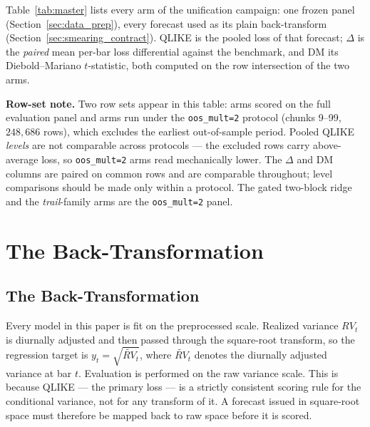 Table~\ref{tab:master} lists every arm of the unification campaign: one
frozen panel (Section~\ref{sec:data_prep}), every forecast used as its
plain back-transform (Section~\ref{sec:smearing_contract}). QLIKE is the
pooled loss of that forecast;
$\Delta$ is the \emph{paired} mean per-bar loss differential against the
benchmark, and DM its Diebold--Mariano $t$-statistic, both computed on the
row intersection of the two arms.

\textbf{Row-set note.} Two row sets
appear in this table: arms scored on the full evaluation panel and
arms run under the \texttt{oos\_mult=2} protocol (chunks 9--99,
$248{,}686$ rows), which excludes the earliest out-of-sample period.
Pooled QLIKE \emph{levels} are not comparable across protocols --- the
excluded rows carry above-average loss, so \texttt{oos\_mult=2} arms
read mechanically lower. The $\Delta$ and DM columns are paired on
common rows and are comparable throughout; level comparisons should be
made only within a protocol. The gated two-block ridge and the
\emph{trail}-family arms are the \texttt{oos\_mult=2} panel.
\iffalse
\section{The Back-Transformation}
\label{sec:appendix_backtransform}

\subsection{The Back-Transformation}
\label{sec:smearing_bias}

Every model in this paper is fit on the preprocessed scale. Realized variance
$RV_t$ is diurnally adjusted and then passed through the square-root
transform, so the regression target is $y_t = \sqrt{\widetilde{RV}_t}$, where
$\widetilde{RV}_t$ denotes the diurnally adjusted variance at bar $t$.
Evaluation is performed on the raw variance scale. This is because QLIKE ---
the primary loss --- is a strictly consistent scoring rule for the
conditional variance, not for any transform of it. A forecast issued in
square-root space must therefore be mapped back to raw space before it is
scored.

